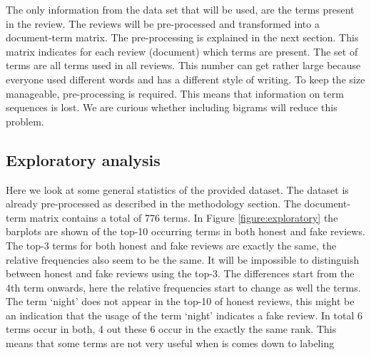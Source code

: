\documentclass[a4paper,11pt]{article}
\begin{document}
The only information from the data set that will be used, are the terms present in the review. The reviews will be pre-processed and transformed into a document-term matrix. The pre-processing is explained in the next section. This matrix indicates for each review (document) which terms are present. The set of terms are all terms used in all reviews. This number can get rather large because everyone used different words and has a different style of writing. To keep the size manageable, pre-processing is required. This means that information on term sequences is lost. We are curious whether including bigrams will reduce this problem. %

\subsection{Exploratory analysis} %
Here we look at some general statistics of the provided dataset. The dataset is already pre-processed as described in the methodology section. The document-term matrix contains a total of 776 terms. In Figure \ref{figure:exploratory} the barplots are shown of the top-10 occurring terms in both honest and fake reviews. The top-3 terms for both honest and fake reviews are exactly the same, the relative frequencies also seem to be the same. It will be impossible to distinguish between honest and fake reviews using the top-3. The differences start from the 4th term onwards, here the relative frequencies start to change as well the terms. The term `night' does not appear in the top-10 of honest reviews, this might be an indication that the usage of the term `night' indicates a fake review. In total 6 terms occur in both, 4 out these 6 occur in the exactly the same rank. This means that some terms are not very useful when is comes down to labeling 
\end{document}

